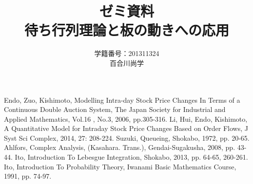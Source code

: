 \documentclass[a4j,papersize,disablejfam,slide,14pt]{jsarticle}
\begin{document}
\title{\Huge ゼミ資料\\待ち行列理論と板の動きへの応用}
\author{\Large 学籍番号：201311324\\百合川尚学}
\maketitle

\tableofcontents

\begin{thebibliography}{9}
         {\rm Endo, Zuo, Kishimoto, 
        Modelling Intra-day Stock Price Changes In Terms of
        a Continuous Double Auction System, 
        The Japan Society for Industrial and Applied Mathematics, 
        Vol.16 , No.3, 2006, pp.305-316.}
         {\rm Li, Hui, Endo, Kishimoto, A Quantitative Model for Intraday Stock Price
         Changes Based on Order Flows, 
         J Syst Sci Complex, 2014, 27: 208-224.}
         {\rm Suzuki, Queueing, Shokabo, 1972, pp. 20-65.}
         {\rm Ahlfors, Complex Analysis, (Kasahara. Trans.), Gendai-Sugakusha, 2008, pp. 43-44.}
         {\rm Ito, Introduction To Lebesgue Integration, Shokabo, 2013, pp. 64-65, 260-261.}
         {\rm Ito, Introduction To Probability Theory, Iwanami Basic Mathematics Course, 1991, pp. 74-97.}
\end{thebibliography}
\end{document}
